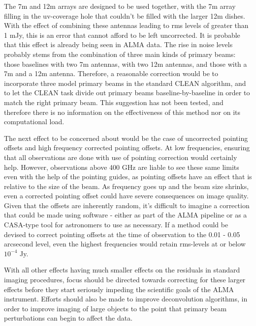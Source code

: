 \documentclass[11pt]{article}
\begin{document}
The 7m and 12m arrays are designed to be used together, with the 7m array 
filling in the uv-coverage hole that couldn't be filled with the larger 12m 
dishes. With the effect of combining these antennas leading to rms levels of 
greater than 1 mJy, this is an error that cannot afford to be left uncorrected.  
It is probable that this effect is already being seen in ALMA data. The rise in
noise levels probably stems from the combination of three main kinds of
primary beams: those baselines with two 7m antennas, with two 12m
antennas, and those with a 7m and a 12m antenna. Therefore, a reasonable
correction would be to incorporate three model primary beams in the standard
CLEAN algorithm, and to let the CLEAN task divide out primary beams
baseline-by-baseline in order to match the right primary beam. This
suggestion has not been tested, and therefore there is no information on the
effectiveness of this method nor on its computational load.

The next effect to be concerned about would be the case of uncorrected pointing 
offsets and high frequency corrected pointing offsets.
At low frequencies, ensuring that all observations are done with use of 
pointing correction would certainly help. However, observations above 400 GHz 
are liable to see these same limits even with the help of the pointing guides, 
as pointing offsets have an effect that is relative to the size of the beam. As 
frequency goes up and the beam size shrinks, even a corrected pointing offset 
could have severe consequences on image quality. Given that the offsets are 
inherently random, it's difficult to imagine a correction that could be made 
using software - either as part of the ALMA pipeline or as a CASA-type tool for 
astronomers to use as necessary.  If a method could be devised to correct 
pointing offsets at the time of observation to the 0.01 - 0.05 arcsecond level, 
even the highest frequencies would retain rms-levels at or below $10^{-4}$ Jy.

With all other effects having much smaller effects on the
residuals in standard imaging procedures, focus should be directed towards
correcting for these larger effects before they start seriously impeding the
scientific goals of the ALMA instrument. Efforts should also be made to improve 
deconvolution algorithms, in order to improve imaging of large objects to the 
point that primary beam perturbations can begin to affect the data.
\end{document}
